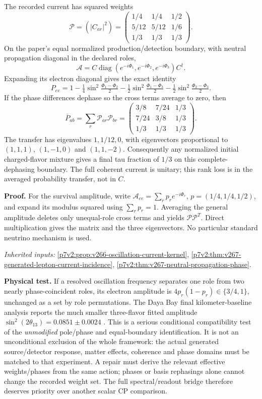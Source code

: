 \documentclass[12pt,a4paper]{article}
\begin{document}
The recorded current has squared weights
\[
\mathcal P=(|C_{ar}|^2)=
\begin{pmatrix}
1/4&1/4&1/2\\5/12&5/12&1/6\\1/3&1/3&1/3
\end{pmatrix}.
\]
On the paper's equal normalized production/detection boundary, with neutral
propagation diagonal in the declared roles,
\[
\mathcal A=C\operatorname{diag}(e^{-i\Phi_1},e^{-i\Phi_2},e^{-i\Phi_3})C^\dagger.
\]
Expanding its electron diagonal gives the exact identity
\[
\boxed{P_{ee}=1-\tfrac14\sin^2\tfrac{\Phi_1-\Phi_2}{2}
 -\tfrac12\sin^2\tfrac{\Phi_1-\Phi_3}{2}
 -\tfrac12\sin^2\tfrac{\Phi_2-\Phi_3}{2}.}
\]
If the phase differences dephase so the cross terms average to zero, then
\[
\boxed{\overline{P}_{ab}=\sum_r\mathcal P_{ar}\mathcal P_{br}
=\begin{pmatrix}
3/8&7/24&1/3\\7/24&3/8&1/3\\1/3&1/3&1/3
\end{pmatrix}.}
\]
The transfer has eigenvalues \(1,1/12,0\), with eigenvectors proportional to
\((1,1,1)\), \((1,-1,0)\) and \((1,1,-2)\). Consequently any normalized
initial charged-flavor mixture gives a final tau fraction of \(1/3\) on
this complete-dephasing boundary. The full coherent current is unitary;
this rank loss is in the averaged probability transfer, not in \(C\).

\textbf{Proof.} For the survival amplitude, write
\(\mathcal A_{ee}=\sum_r p_r e^{-i\Phi_r}\), \(p=(1/4,1/4,1/2)\), and
expand its modulus squared using \(\sum_rp_r=1\). Averaging the general
amplitude deletes only unequal-role cross terms and yields
\(\mathcal P\mathcal P^T\). Direct multiplication gives the matrix and
the three eigenvectors. No particular standard neutrino mechanism is used.
\par\noindent\textit{Inherited inputs:} \ref{p7v2:prop:v266-oscillation-current-kernel}, \ref{p7v2:thm:v267-generated-lepton-current-incidence}, \ref{p7v2:thm:v267-neutral-propagation-phase}.

\textbf{Physical test.} If a resolved oscillation frequency separates one
role from two nearly phase-coincident roles, its electron amplitude is
\(4p_r(1-p_r)\in\{3/4,1\}\), unchanged as a set by role permutations.
The Daya Bay final kilometer-baseline analysis reports the much smaller
three-flavor fitted amplitude \(\sin^2(2\theta_{13})=0.0851\pm0.0024\)
\cite{DayaBayFinal2023}. This is a serious conditional compatibility test of the
\emph{unmodified} pole/phase and equal-boundary identification. It is not an
unconditional exclusion of the whole framework: the actual generated
source/detector response, matter effects, coherence and phase domains must
be matched to that experiment. A repair must derive the relevant effective
weights/phases from the same action; phases or basis rephasings alone cannot
change the recorded weight set. The full spectral/readout bridge therefore
deserves priority over another scalar CP comparison.
\end{document}
